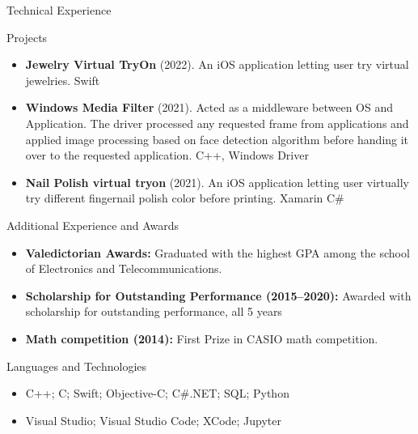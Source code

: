 \documentclass[calibri]{mcdowellcv}
\begin{document}
	\begin{cvsection}{Technical Experience}
		\begin{cvsubsection}{Projects}{}{}
			\begin{itemize}
				\item \textbf{Jewelry Virtual TryOn} (2022). An iOS application letting user try virtual jewelries. Swift
				\item \textbf{Windows Media Filter} (2021). Acted as a middleware between OS and Application. The driver processed any requested frame from applications and applied image processing based on face detection algorithm before handing it over to the requested application.  C++, Windows Driver
				\item \textbf{Nail Polish virtual tryon} (2021). An iOS application letting user virtually try different fingernail polish color before printing. Xamarin C\#
			\end{itemize}
		\end{cvsubsection}
	\end{cvsection}
	
	\begin{cvsection}{Additional Experience and Awards}
		\begin{cvsubsection}{}{}{}	
			\begin{itemize}
				\item \textbf{Valedictorian Awards:} Graduated with the highest GPA among the school of Electronics and Telecommunications.
				\item \textbf{Scholarship for Outstanding Performance (2015--2020):} Awarded with scholarship for outstanding performance, all 5 years
				\item \textbf{Math competition (2014):} First Prize in CASIO math competition.
			\end{itemize}
		\end{cvsubsection}
	\end{cvsection}
	
	\begin{cvsection}{Languages and Technologies}
		\begin{cvsubsection}{}{}{}	
			\begin{itemize}
				\item C++; C; Swift; Objective-C; C\#.NET; SQL; Python 
				\item Visual Studio; Visual Studio Code; XCode; Jupyter
			\end{itemize}
		\end{cvsubsection}
	\end{cvsection}
	
\end{document}
